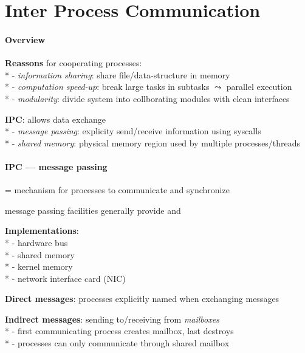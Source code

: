 \section{Inter Process Communication}

\paragraph{Overview}
\begin{items}
  \item \textbf{Reassons} for cooperating processes: \\*
    - \emph{information sharing}: share file/data-structure in memory \\*
    - \emph{computation speed-up}: break large tasks in subtasks \( \leadsto \) parallel execution \\*
    - \emph{modularity}: divide system into collborating modules with clean interfaces
  \item \textbf{IPC}: allows data exchange \\*
    - \emph{message passing}: explicity send/receive information using syscalls \\*
    - \emph{shared memory}: physical memory region used by multiple processes/threads
\end{items}

\paragraph{IPC --- message passing}
\begin{items}
  \item = mechanism for processes to communicate and synchronize
  \item message passing facilities generally provide  and 
  \item \textbf{Implementations}: \\*
    - hardware bus \\*
    - shared memory \\*
    - kernel memory \\*
    - network interface card (NIC)
  \item \textbf{Direct messages}: processes explicitly named when exchanging messages
  \item \textbf{Indirect messages}: sending to/receiving from \emph{mailboxes} \\*
    - first communicating process creates mailbox, last destroys \\*
    - processes can only communicate through shared mailbox
\end{items}

